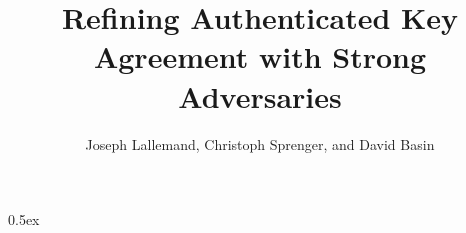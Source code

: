 \documentclass[11pt,a4paper]{article}
\begin{document}
\title{Refining Authenticated Key Agreement with Strong Adversaries}
\author{Joseph Lallemand, Christoph Sprenger, and David Basin}
\maketitle

\tableofcontents

\parindent 0pt\parskip 0.5ex





%
%
\end{document}
